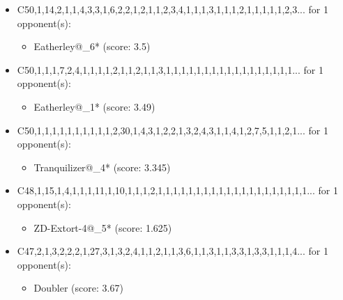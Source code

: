 \begin{appendices}
\begin{itemize}
    \item C50,1,14,2,1,1,4,3,3,1,6,2,2,1,2,1,1,2,3,4,1,1,1,3,1,1,1,2,1,1,1,1,1,2,3... for 1 opponent(s):
    \begin{multicols}{3}
         \begin{itemize}
            \item Eatherley@\_6* (score: 3.5)
        \end{itemize}
     \end{multicols}
     
    \item C50,1,1,1,7,2,4,1,1,1,1,2,1,1,2,1,1,3,1,1,1,1,1,1,1,1,1,1,1,1,1,1,1,1,1... for 1 opponent(s):
    \begin{multicols}{3}
         \begin{itemize}
            \item Eatherley@\_1* (score: 3.49)
        \end{itemize}
     \end{multicols}
     
    \item C50,1,1,1,1,1,1,1,1,1,1,2,30,1,4,3,1,2,2,1,3,2,4,3,1,1,4,1,2,7,5,1,1,2,1... for 1 opponent(s):
    \begin{multicols}{3}
         \begin{itemize}
            \item Tranquilizer@\_4* (score: 3.345)
        \end{itemize}
     \end{multicols}
     
    \item C48,1,15,1,4,1,1,1,11,1,10,1,1,1,2,1,1,1,1,1,1,1,1,1,1,1,1,1,1,1,1,1,1,1,1... for 1 opponent(s):
    \begin{multicols}{3}
         \begin{itemize}
            \item ZD-Extort-4@\_5* (score: 1.625)
        \end{itemize}
     \end{multicols}
     
    \item C47,2,1,3,2,2,2,1,27,3,1,3,2,4,1,1,2,1,1,3,6,1,1,3,1,1,3,3,1,3,3,1,1,1,4... for 1 opponent(s):
    \begin{multicols}{3}
         \begin{itemize}
            \item Doubler (score: 3.67)
        \end{itemize}
     \end{multicols}
     

\end{itemize}
\end{appendices}
